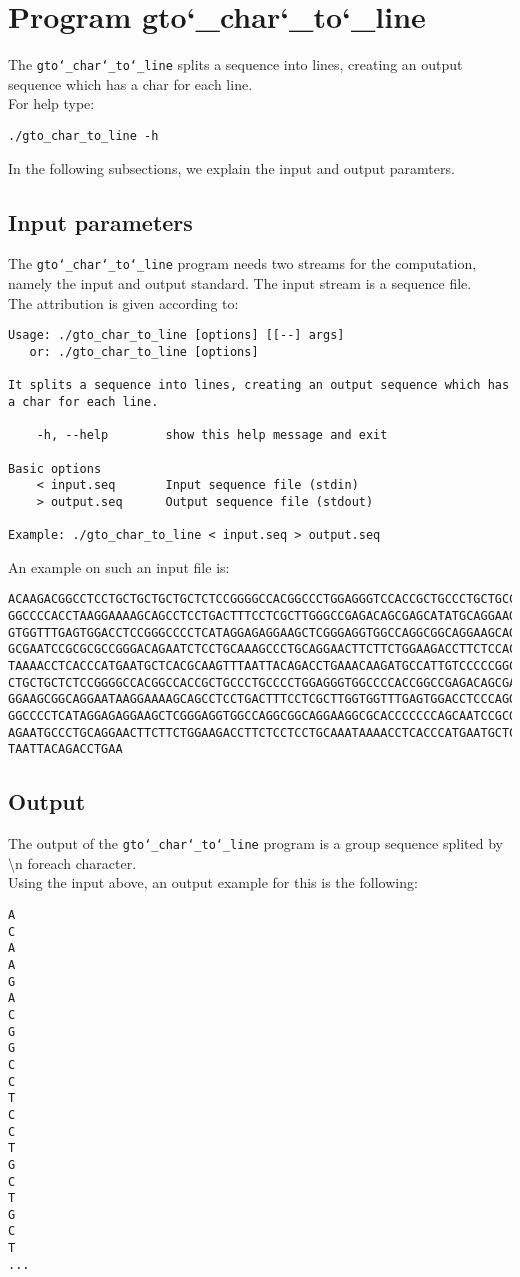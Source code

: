 \section{Program gto\char`_char\char`_to\char`_line}
The \texttt{gto\char`_char\char`_to\char`_line} splits a sequence into lines, creating an output sequence which has a char for each line.\\
For help type:
\begin{lstlisting}
./gto_char_to_line -h
\end{lstlisting}
In the following subsections, we explain the input and output paramters.

\subsection*{Input parameters}

The \texttt{gto\char`_char\char`_to\char`_line} program needs two streams for the computation, namely the input and output standard. The input stream is a sequence file.\\
The attribution is given according to:
\begin{lstlisting}
Usage: ./gto_char_to_line [options] [[--] args]
   or: ./gto_char_to_line [options]

It splits a sequence into lines, creating an output sequence which has a char for each line.

    -h, --help        show this help message and exit

Basic options
    < input.seq       Input sequence file (stdin)
    > output.seq      Output sequence file (stdout)

Example: ./gto_char_to_line < input.seq > output.seq
\end{lstlisting}
An example on such an input file is:
\begin{lstlisting}
ACAAGACGGCCTCCTGCTGCTGCTGCTCTCCGGGGCCACGGCCCTGGAGGGTCCACCGCTGCCCTGCTGCCATTGTCCCC
GGCCCCACCTAAGGAAAAGCAGCCTCCTGACTTTCCTCGCTTGGGCCGAGACAGCGAGCATATGCAGGAAGCGGCAGGAA
GTGGTTTGAGTGGACCTCCGGGCCCCTCATAGGAGAGGAAGCTCGGGAGGTGGCCAGGCGGCAGGAAGCAGGCCAGTGCC
GCGAATCCGCGCGCCGGGACAGAATCTCCTGCAAAGCCCTGCAGGAACTTCTTCTGGAAGACCTTCTCCACCCCCCCAGC
TAAAACCTCACCCATGAATGCTCACGCAAGTTTAATTACAGACCTGAAACAAGATGCCATTGTCCCCCGGCCTCCTGCTG
CTGCTGCTCTCCGGGGCCACGGCCACCGCTGCCCTGCCCCTGGAGGGTGGCCCCACCGGCCGAGACAGCGAGCATATGCA
GGAAGCGGCAGGAATAAGGAAAAGCAGCCTCCTGACTTTCCTCGCTTGGTGGTTTGAGTGGACCTCCCAGGCCAGTGCCG
GGCCCCTCATAGGAGAGGAAGCTCGGGAGGTGGCCAGGCGGCAGGAAGGCGCACCCCCCCAGCAATCCGCGCGCCGGGAC
AGAATGCCCTGCAGGAACTTCTTCTGGAAGACCTTCTCCTCCTGCAAATAAAACCTCACCCATGAATGCTCACGCAAGTT
TAATTACAGACCTGAA
\end{lstlisting}

\subsection*{Output}
The output of the \texttt{gto\char`_char\char`_to\char`_line} program is a group sequence splited by \textbackslash n foreach character.\\
Using the input above, an output example for this is the following:
\begin{lstlisting}
A
C
A
A
G
A
C
G
G
C
C
T
C
C
T
G
C
T
G
C
T
...
\end{lstlisting}
